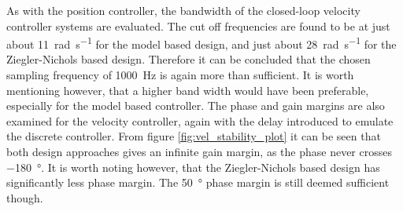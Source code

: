 \documentclass[../../main.tex]{subfiles}
\begin{document}
As with the position controller, the bandwidth of the closed-loop velocity controller systems are evaluated. The cut off frequencies are found to be at just about \SI{11}{\radian \per \second} for the model based design, and just about \SI{28}{\radian \per \second} for the Ziegler-Nichols based design. Therefore it can be concluded that the chosen sampling frequency of \SI{1000}{\hertz} is again more than sufficient. It is worth mentioning however, that a higher band width would have been preferable, especially for the model based controller. 
The phase and gain margins are also examined for the velocity controller, again with the delay introduced to emulate the discrete controller. 
From figure \ref{fig:vel_stability_plot} it can be seen that both design approaches gives an infinite gain margin, as the phase never crosses \SI{-180}{\degree}. It is worth noting however, that the Ziegler-Nichols based design has significantly less phase margin. The \SI{50}{\degree} phase margin is still deemed sufficient though.

\end{document}
